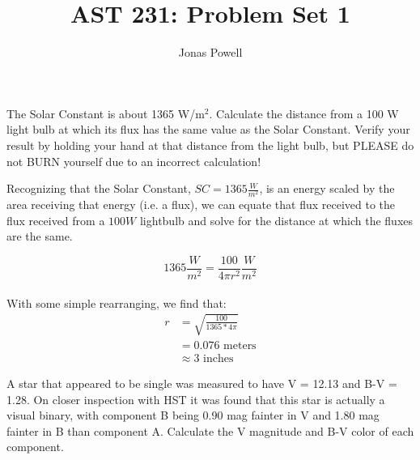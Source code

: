 \documentclass[12pt]{article}
\newenvironment{problem}[2][Problem]{\begin{trivlist}
\item[\hskip \labelsep {\bfseries #1}\hskip \labelsep {\bfseries #2.}]}{\end{trivlist}}
\newenvironment{answer}[2][Answer]{\begin{trivlist}
\item[\hskip \labelsep {\bfseries #1}\hskip \labelsep {\bfseries #2.}]}{\end{trivlist}}
\begin{document}

\title{AST 231: Problem Set 1}
\author{Jonas Powell}
\maketitle

\begin{problem}{1}
The Solar Constant is about 1365 W/m$^2$. Calculate the distance from a 100 W light bulb at which its flux has the same value as the Solar Constant. Verify your result by holding your hand at that distance from the light bulb, but PLEASE do not BURN yourself due to an incorrect calculation!
\end{problem}

\begin{answer}{1}

  Recognizing that the Solar Constant, $SC=1365 \frac{W}{m^{2}}$, is an energy scaled by the area receiving that energy (i.e. a flux), we can equate that flux received to the flux received from a $ 100 W $ lightbulb and solve for the distance at which the fluxes are the same.

  \begin{equation}
    1365 \frac{W}{m^{2}} = \frac{100}{4 \pi r^{2}} \frac{W}{m^{2}}
  \end{equation}
  \\

  With some simple rearranging, we find that:
  \\

  \begin{equation}
    \begin{align}
      r & = \sqrt{\frac{100}{1365 * 4 \pi}} \\
      & = 0.076 \text{ meters} \\
      & \approx 3 \text{ inches}
    \end{align}
  \end{equation}

\end{answer}

\bigskip
\bigskip


\begin{problem}{2}
A star that appeared to be single was measured to have V = 12.13 and B-V = 1.28. On closer inspection with HST it was found that this star is actually a visual binary, with component B being 0.90 mag fainter in V and 1.80 mag fainter in B than component A. Calculate the V magnitude and B-V color of each component.
\end{problem}
\end{document}
